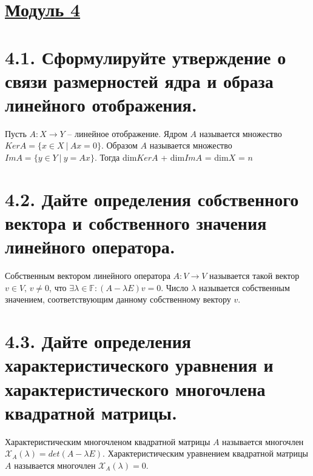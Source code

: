 \documentclass{article}
\begin{document}
\newpage
{}
\section*{\LARGE\centering \underline{Модуль 4}}

\section*{\LARGE 4.1. Сформулируйте утверждение о связи размерностей ядра и образа линейного отображения.}
Пусть $A : X \rightarrow Y$ -- линейное отображение.
\newline Ядром $A$ называется множество $KerA = \{x \in X \:|\: Ax = 0\}$. 
\newline Образом $A$ называется множество $ImA = \{y \in Y \:|\: y = Ax\}$.
\newline Тогда dim$KerA$ + dim$ImA$ = dim$X$ = $n$

\section*{\LARGE 4.2. Дайте определения собственного вектора и собственного значения линейного оператора.}
Собственным вектором линейного оператора $A : V \rightarrow V$ называется такой вектор $v \in V,\, v \ne 0$, что $\exists \lambda \in \mathbb{F} : (A - \lambda E)v = 0$. Число $\lambda$ называется собственным значением, соответствующим данному собственному вектору $v$.

\section*{\LARGE 4.3. Дайте определения характеристического уравнения и характеристического многочлена квадратной матрицы.}
Характеристическим многочленом квадратной матрицы $A$ называется многочлен $\mathcal{X}_A(\lambda) = det(A - \lambda E)$.
\newline Характеристическим уравнением квадратной матрицы $A$ называется многочлен $\mathcal{X}_A(\lambda) = 0$.

\end{document}
